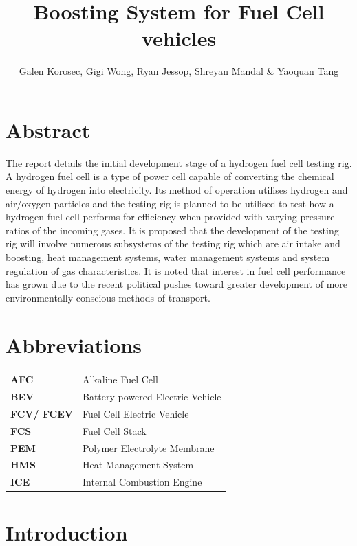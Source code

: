 \documentclass[a4paper,11pt]{article}
\title{Boosting System for Fuel Cell vehicles}
\author{Galen Korosec, Gigi Wong, Ryan Jessop, Shreyan Mandal \& Yaoquan Tang}
\begin{document}
\maketitle

\section*{Abstract}

The report details the initial development stage of a hydrogen fuel cell testing rig. A hydrogen fuel cell is a type of power cell capable of converting the chemical energy of hydrogen into electricity. Its method of operation utilises hydrogen and air/oxygen particles and the testing rig is planned to be utilised to test how a hydrogen fuel cell performs for efficiency when provided with varying pressure ratios of the incoming gases. It is proposed that the development of the testing rig will involve numerous subsystems of the testing rig which are air intake and boosting, heat management systems, water management systems and system regulation of gas characteristics. It is noted that interest in fuel cell performance has grown due to the recent political pushes toward greater development of more environmentally conscious methods of transport.

\tableofcontents

\section*{Abbreviations}

\begin{tabular}{ l l }
    \textbf{AFC} & Alkaline Fuel Cell \\
    \textbf{BEV} & Battery-powered Electric Vehicle \\
    \textbf{FCV/ FCEV} & Fuel Cell Electric Vehicle \\
    \textbf{FCS} & Fuel Cell Stack \\
    \textbf{PEM} & Polymer Electrolyte Membrane \\
    \textbf{HMS} & Heat Management System \\
    \textbf{ICE} & Internal Combustion Engine \\
\end{tabular}

\section{Introduction}
\end{document}
